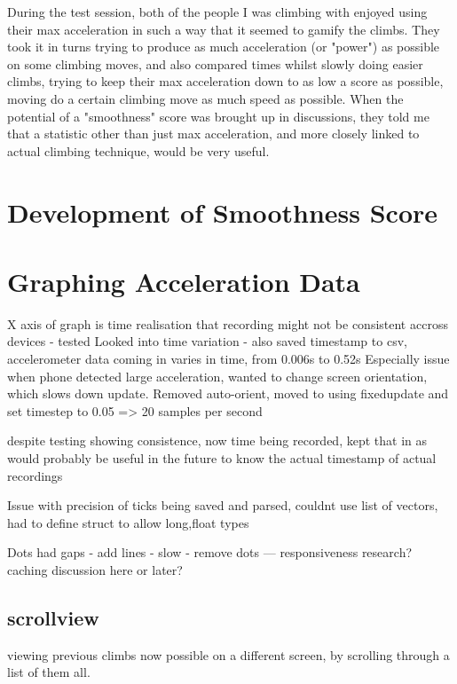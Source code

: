 During the test session, both of the people I was climbing with enjoyed using their max acceleration in such a way that it seemed to gamify the climbs.
They took it in turns trying to produce as much acceleration (or "power") as possible on some climbing moves, and also compared times whilst slowly doing easier climbs, trying to keep their max acceleration down to as low a score as possible, moving do a certain climbing move as much speed as possible.
When the potential of a "smoothness" score was brought up in discussions, they told me that a statistic other than just max acceleration, and more closely linked to actual climbing technique, would be very useful.


\section{Development of Smoothness Score}





\section{Graphing Acceleration Data}
X axis of graph is time
realisation that recording might not be consistent accross devices - tested 
Looked into time variation - also saved timestamp to csv, accelerometer data coming in varies in time, from 0.006s to 0.52s 
Especially issue when phone detected large acceleration, wanted to change screen orientation, which slows down update.
Removed auto-orient,  moved to using fixedupdate and set timestep to 0.05 => 20 samples per second

despite testing showing consistence, now time being recorded, kept that in as would probably be useful in the future to know the actual timestamp of actual recordings



Issue with precision of ticks being saved and parsed, couldnt use list of vectors, had to define struct to allow long,float types


Dots had gaps - add lines - slow - remove dots ---  responsiveness research?
caching discussion here or later?


\subsection{scrollview}
viewing previous climbs now possible on a different screen, by scrolling through a list of them all.

